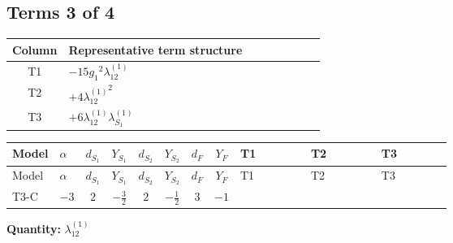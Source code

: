 \documentclass[8pt]{article}
\begin{document}
\begin{landscape}
\subsection*{Terms 3 of 4}
\begin{center}
\begin{tabular}{@{}c >{\raggedright\arraybackslash}p{0.82\linewidth}@{}}
\toprule
Column & Representative term structure \\
\midrule
T1 & \(\displaystyle -15 {g_1}^2 {\lambda_{12}^{(1)}}\) \\
\midrule
T2 & \(\displaystyle +4 {\lambda_{12}^{(1)}}^2\) \\
\midrule
T3 & \(\displaystyle +6 {\lambda_{12}^{(1)}} {\lambda_{S_1}^{(1)}}\) \\
\midrule
\bottomrule
\end{tabular}
\end{center}
\smallskip
\tiny
\begin{longtable}{@{}llcccccc >{\raggedright\arraybackslash}p{0.21\linewidth} >{\raggedright\arraybackslash}p{0.21\linewidth} >{\raggedright\arraybackslash}p{0.21\linewidth}@{}}
\toprule
Model & $\alpha$ & $d_{S_1}$ & $Y_{S_1}$ & $d_{S_2}$ & $Y_{S_2}$ & $d_F$ & $Y_F$ & T1 & T2 & T3 \\
\midrule
\endfirsthead
\toprule
Model & $\alpha$ & $d_{S_1}$ & $Y_{S_1}$ & $d_{S_2}$ & $Y_{S_2}$ & $d_F$ & $Y_F$ & T1 & T2 & T3 \\
\midrule
\endhead
T3-C & $-3$ & $2$ & $-\frac{3}{2}$ & $2$ & $-\frac{1}{2}$ & $3$ & $-1$ & \scriptsize\adjustbox{max width=\linewidth}{$\begin{gathered} -15 {g_1}^2 {\lambda_{12}^{(1)}}\end{gathered}$} & \scriptsize\adjustbox{max width=\linewidth}{$\begin{gathered} +4 {\lambda_{12}^{(1)}}^2\end{gathered}$} & \scriptsize\adjustbox{max width=\linewidth}{$\begin{gathered} +6 {\lambda_{12}^{(1)}} {\lambda_{S_1}^{(1)}}\end{gathered}$} \\
\midrule
\bottomrule
\end{longtable}
\clearpage
\noindent\textbf{Quantity: }$\lambda_{12}^{(1)}$\par\smallskip

\end{landscape}
\end{document}
